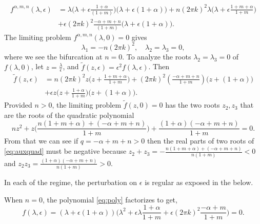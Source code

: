 \documentclass[a4paper,11pt]{article}
\theoremstyle{remark}
\begin{document}
\begin{align}
f^{\alpha,m,n}(\lambda,\epsilon)&= \lambda\Big(\lambda + \epsilon\frac{1+\alpha}{(1+m)}\Big)\Big(\lambda + \epsilon(1+\alpha)\Big) + n(2\pi k)^2\lambda\Big(\lambda + \epsilon\frac{1+m+\alpha}{1+m}\Big) \nonumber \\
&+ \epsilon(2\pi k)^2\frac{-\alpha+m+n}{(1+m)}\Big(\lambda + \epsilon(1+\alpha)\Big).
\end{align}
The limiting problem $f^{\alpha,m,n}(\lambda,0)=0$ gives 
$$ \lambda_1 = -n(2\pi k)^2, \quad \lambda_2=\lambda_3=0,$$
where we see the bifurcation at $n=0$. To analyze the roots $\lambda_2=\lambda_3=0$  of $f(\lambda,0)$, let $z = \frac{\lambda}{\epsilon}$, and $\tilde{f}(z,\epsilon) = \epsilon^2 f(\lambda, \epsilon)$. Then
\begin{align}
 \tilde{f}(z,\epsilon) &= n(2\pi k)^2 z\Big(z + \frac{1+m+\alpha}{1+m}\Big)+ (2\pi k)^2\left(\frac{-\alpha+m+n}{1+m}\right)\Big(z + (1+\alpha)\Big) \nonumber\\
 &+ \epsilon z\Big(z+\frac{1+\alpha}{1+m}\Big)\Big(z+(1+\alpha)\Big). \label{eq:reduced_poly}
\end{align}
Provided $n>0$, the limiting problem $\tilde{f}(z,0)=0$ has the two roots $z_2,z_3$ that are the roots of the quadratic polynomial
\begin{equation} 
nz^2 + z\Big( \frac{n(1+m+\alpha) + (-\alpha+m+n)}{1+m}\Big) + \frac{(1+\alpha)(-\alpha+m+n)}{1+m} =0. \label{eq:auxquad} 
\end{equation}
From that we can see if $q=-\alpha+m+n>0$ then the real parts of two roots of \eqref{eq:auxquad} must be negative because $z_2+z_3 = -\frac{n(1+m+\alpha) + (-\alpha+m+n)}{n(1+m)} < 0$ and $z_2z_3=\frac{(1+\alpha)(-\alpha+m+n)}{n(1+m)}>0$. 

In each of the regime, the perturbation on $\epsilon$ is regular as exposed in the below.

When $n=0$, the polynomial \eqref{eq:poly} factorizes to get,
$$ f(\lambda,\epsilon) = (\lambda +\epsilon(1+\alpha))\Big( \lambda^2 + \epsilon\lambda \frac{1+\alpha}{1+m} + \epsilon (2\pi k)^2 \frac{-\alpha+m}{1+m}\Big)=0.$$
\end{document}
